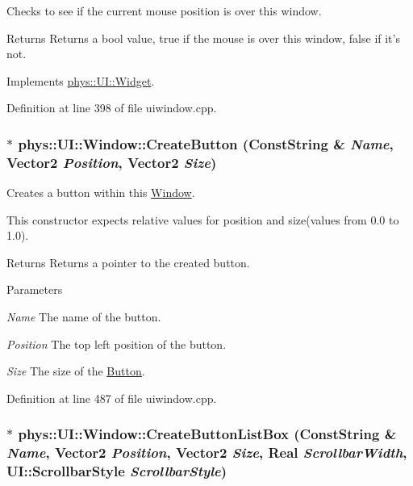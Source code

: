 Checks to see if the current mouse position is over this window. 

\begin{DoxyReturn}{Returns}
Returns a bool value, true if the mouse is over this window, false if it's not. 
\end{DoxyReturn}


Implements \hyperlink{classphys_1_1UI_1_1Widget_a613df6dbb42efe139d185043a00259dc}{phys::UI::Widget}.



Definition at line 398 of file uiwindow.cpp.

\hypertarget{classphys_1_1UI_1_1Window_a022f3d02aa8d99cb6d8abccddbc9e662}{
\subsubsection[{CreateButton}]{ $\ast$ phys::UI::Window::CreateButton ({\bf ConstString} \& {\em Name}, \/  {\bf Vector2} {\em Position}, \/  {\bf Vector2} {\em Size})}}
\label{d4/d86/classphys_1_1UI_1_1Window_a022f3d02aa8d99cb6d8abccddbc9e662}


Creates a button within this \hyperlink{classphys_1_1UI_1_1Window}{Window}. 

This constructor expects relative values for position and size(values from 0.0 to 1.0). \begin{DoxyReturn}{Returns}
Returns a pointer to the created button. 
\end{DoxyReturn}

\begin{DoxyParams}{Parameters}
\item[{\em Name}]The name of the button. \item[{\em Position}]The top left position of the button. \item[{\em Size}]The size of the \hyperlink{classphys_1_1UI_1_1Button}{Button}. \end{DoxyParams}


Definition at line 487 of file uiwindow.cpp.

\hypertarget{classphys_1_1UI_1_1Window_af610b6a37bfe4d6c2050f2fba3977020}{
\subsubsection[{CreateButtonListBox}]{ $\ast$ phys::UI::Window::CreateButtonListBox ({\bf ConstString} \& {\em Name}, \/  {\bf Vector2} {\em Position}, \/  {\bf Vector2} {\em Size}, \/  {\bf Real} {\em ScrollbarWidth}, \/  UI::ScrollbarStyle {\em ScrollbarStyle})}}
\label{d4/d86/classphys_1_1UI_1_1Window_af610b6a37bfe4d6c2050f2fba3977020}


